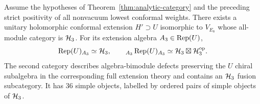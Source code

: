 \begin{theorem}
\label{thm:analytic-e8-extension}
Assume the hypotheses of Theorem~\ref{thm:analytic-category} and the
preceding strict positivity of all nonvacuum lowest conformal weights.
There exists a unitary holomorphic conformal extension $H'\supset U$
isomorphic to $V_{E_8}$ whose all-module category is $\mathcal H_3$.
For its extension algebra $A_3\in\operatorname{Rep}(U)$,
\begin{equation}
 \operatorname{Rep}(U)_{A_3}\simeq\mathcal H_3,
 \qquad
 {}_{A_3}\operatorname{Rep}(U)_{A_3}\simeq\mathcal H_3\boxtimes\mathcal H_3^{\mathrm{op}}.
 \label{eq:analytic-extension-defects}
\end{equation}
The second category describes algebra-bimodule defects preserving the
$U$ chiral subalgebra in the corresponding full extension theory and
contains an $\mathcal H_3$ fusion subcategory.  It has $36$ simple objects,
labelled by ordered pairs of simple objects of $\mathcal H_3$.
\end{theorem}
